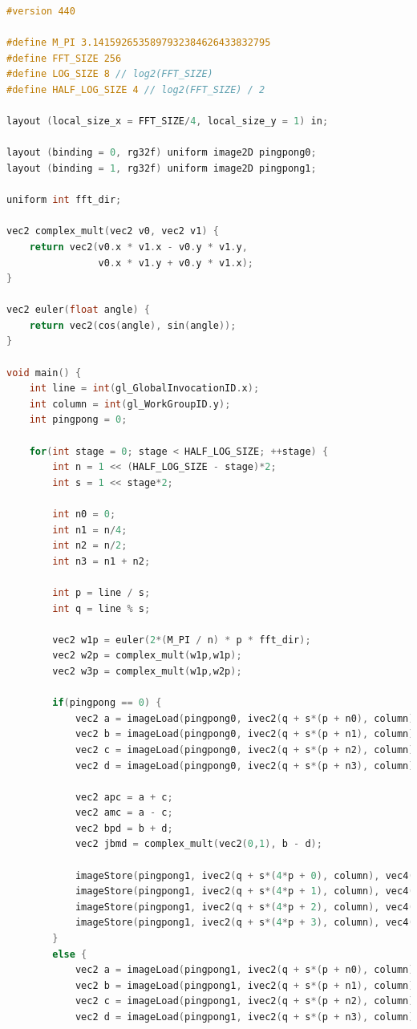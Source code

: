 \documentclass[
  oneside,
  11pt, a4paper,
  footinclude=true,
  headinclude=true,
  cleardoublepage=empty
]{scrbook}
\begin{document}
\begin{lstlisting}[language=C, caption={FFT Radix-4 Stockham Horizontal unique pass, see \autoref{subsec:radix4-stockham}}, label={lst:glsl-radix4-stockham-horizontal}]
#version 440

#define M_PI 3.1415926535897932384626433832795
#define FFT_SIZE 256
#define LOG_SIZE 8 // log2(FFT_SIZE)
#define HALF_LOG_SIZE 4 // log2(FFT_SIZE) / 2

layout (local_size_x = FFT_SIZE/4, local_size_y = 1) in;

layout (binding = 0, rg32f) uniform image2D pingpong0;
layout (binding = 1, rg32f) uniform image2D pingpong1;

uniform int fft_dir;

vec2 complex_mult(vec2 v0, vec2 v1) {
    return vec2(v0.x * v1.x - v0.y * v1.y,
                v0.x * v1.y + v0.y * v1.x);
}

vec2 euler(float angle) {
    return vec2(cos(angle), sin(angle));
}

void main() {
    int line = int(gl_GlobalInvocationID.x);
    int column = int(gl_WorkGroupID.y);
    int pingpong = 0;

    for(int stage = 0; stage < HALF_LOG_SIZE; ++stage) {
        int n = 1 << (HALF_LOG_SIZE - stage)*2;
        int s = 1 << stage*2;

        int n0 = 0;
        int n1 = n/4;
        int n2 = n/2;
        int n3 = n1 + n2;

        int p = line / s;
        int q = line % s;

        vec2 w1p = euler(2*(M_PI / n) * p * fft_dir);
        vec2 w2p = complex_mult(w1p,w1p);
        vec2 w3p = complex_mult(w1p,w2p);

        if(pingpong == 0) {
            vec2 a = imageLoad(pingpong0, ivec2(q + s*(p + n0), column)).rg;
            vec2 b = imageLoad(pingpong0, ivec2(q + s*(p + n1), column)).rg;
            vec2 c = imageLoad(pingpong0, ivec2(q + s*(p + n2), column)).rg;
            vec2 d = imageLoad(pingpong0, ivec2(q + s*(p + n3), column)).rg;

            vec2 apc = a + c;
            vec2 amc = a - c;
            vec2 bpd = b + d;
            vec2 jbmd = complex_mult(vec2(0,1), b - d);

            imageStore(pingpong1, ivec2(q + s*(4*p + 0), column), vec4(apc + bpd, 0,0));
            imageStore(pingpong1, ivec2(q + s*(4*p + 1), column), vec4(complex_mult(w1p, amc + jbmd*fft_dir), 0,0));
            imageStore(pingpong1, ivec2(q + s*(4*p + 2), column), vec4(complex_mult(w2p, apc - bpd ), 0,0));
            imageStore(pingpong1, ivec2(q + s*(4*p + 3), column), vec4(complex_mult(w3p, amc - jbmd*fft_dir), 0,0));
        }
        else {
            vec2 a = imageLoad(pingpong1, ivec2(q + s*(p + n0), column)).rg;
            vec2 b = imageLoad(pingpong1, ivec2(q + s*(p + n1), column)).rg;
            vec2 c = imageLoad(pingpong1, ivec2(q + s*(p + n2), column)).rg;
            vec2 d = imageLoad(pingpong1, ivec2(q + s*(p + n3), column)).rg;


\end{lstlisting}
\end{document}
